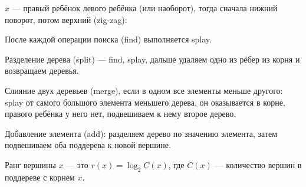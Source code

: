 \noindent
\begin{minipage}{\textwidth}
    $x$ --- правый ребёнок левого ребёнка (или наоборот),
    тогда сначала нижний поворот, потом верхний (zig-zag):

    \begin{center}
    \end{center}
\end{minipage}

После каждой операции поиска (find) выполняется splay.

Разделение дерева (split) --- find, splay,
дальше удаляем одно из рёбер из корня и возвращаем
деревья.

Слияние двух деревьев (merge),
если в одном все элементы меньше другого:
splay от самого большого элемента меньшего дерева,
он оказывается в корне, правого ребёнка у него нет,
подвешиваем к нему второе дерево.

Добавление элемента (add):
разделяем дерево по значению элемента,
затем подвешиваем оба поддерева к новой вершине.

\begin{definition}
    Ранг вершины $x$
    --- это $r(x) = \log_2 C(x)$,
    где $C(x)$ --- количество вершин в поддереве с корнем $x$.
\end{definition}

